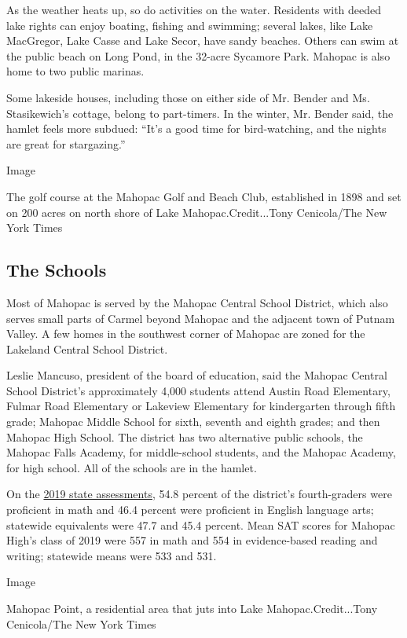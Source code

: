 As the weather heats up, so do activities on the water. Residents with
deeded lake rights can enjoy boating, fishing and swimming; several
lakes, like Lake MacGregor, Lake Casse and Lake Secor, have sandy
beaches. Others can swim at the public beach on Long Pond, in the
32-acre Sycamore Park. Mahopac is also home to two public marinas.

Some lakeside houses, including those on either side of Mr. Bender and
Ms. Stasikewich's cottage, belong to part-timers. In the winter, Mr.
Bender said, the hamlet feels more subdued: ``It's a good time for
bird-watching, and the nights are great for stargazing.''

Image

The golf course at the Mahopac Golf and Beach Club, established in 1898
and set on 200 acres on north shore of Lake Mahopac.Credit...Tony
Cenicola/The New York Times

\hypertarget{the-schools}{%
\subsection{The Schools}\label{the-schools}}

Most of Mahopac is served by the Mahopac Central School District, which
also serves small parts of Carmel beyond Mahopac and the adjacent town
of Putnam Valley. A few homes in the southwest corner of Mahopac are
zoned for the Lakeland Central School District.

Leslie Mancuso, president of the board of education, said the Mahopac
Central School District's approximately 4,000 students attend Austin
Road Elementary, Fulmar Road Elementary or Lakeview Elementary for
kindergarten through fifth grade; Mahopac Middle School for sixth,
seventh and eighth grades; and then Mahopac High School. The district
has two alternative public schools, the Mahopac Falls Academy, for
middle-school students, and the Mahopac Academy, for high school. All of
the schools are in the hamlet.

On the
\href{https://data.nysed.gov/profile.php?instid=800000039764}{2019 state
assessments}, 54.8 percent of the district's fourth-graders were
proficient in math and 46.4 percent were proficient in English language
arts; statewide equivalents were 47.7 and 45.4 percent. Mean SAT scores
for Mahopac High's class of 2019 were 557 in math and 554 in
evidence-based reading and writing; statewide means were 533 and 531.

Image

Mahopac Point, a residential area that juts into Lake
Mahopac.Credit...Tony Cenicola/The New York Times

